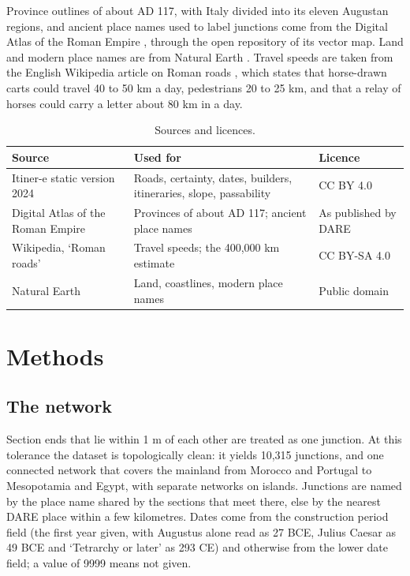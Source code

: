 \documentclass[11pt,a4paper]{article}
\begin{document}
Province outlines of about AD 117, with Italy divided into its eleven Augustan regions, and ancient place names used to label junctions come from the Digital Atlas of the Roman Empire \citep{dare}, through the open repository of its vector map. Land and modern place names are from Natural Earth \citep{naturalearth}. Travel speeds are taken from the English Wikipedia article on Roman roads \citep{wikiroads}, which states that horse-drawn carts could travel 40 to 50 km a day, pedestrians 20 to 25 km, and that a relay of horses could carry a letter about 80 km in a day.

\begin{table}[tbp]\centering\small\caption{Sources and licences.}\label{tab:sources}
\begin{tabular}{>{\raggedright\arraybackslash}p{4.4cm}>{\raggedright\arraybackslash}p{7cm}>{\raggedright\arraybackslash}p{3cm}}\toprule Source & Used for & Licence\\\midrule
Itiner-e static version 2024 & Roads, certainty, dates, builders, itineraries, slope, passability & CC BY 4.0\\
Digital Atlas of the Roman Empire & Provinces of about AD 117; ancient place names & As published by DARE\\
Wikipedia, `Roman roads' & Travel speeds; the 400,000 km estimate & CC BY-SA 4.0\\
Natural Earth & Land, coastlines, modern place names & Public domain\\
\bottomrule\end{tabular}\end{table}

\section{Methods}
\subsection{The network}
Section ends that lie within 1 m of each other are treated as one junction. At this tolerance the dataset is topologically clean: it yields 10,315 junctions, and one connected network that covers the mainland from Morocco and Portugal to Mesopotamia and Egypt, with separate networks on islands. Junctions are named by the place name shared by the sections that meet there, else by the nearest DARE place within a few kilometres. Dates come from the construction period field (the first year given, with Augustus alone read as 27 BCE, Julius Caesar as 49 BCE and `Tetrarchy or later' as 293 CE) and otherwise from the lower date field; a value of 9999 means not given.
\end{document}
